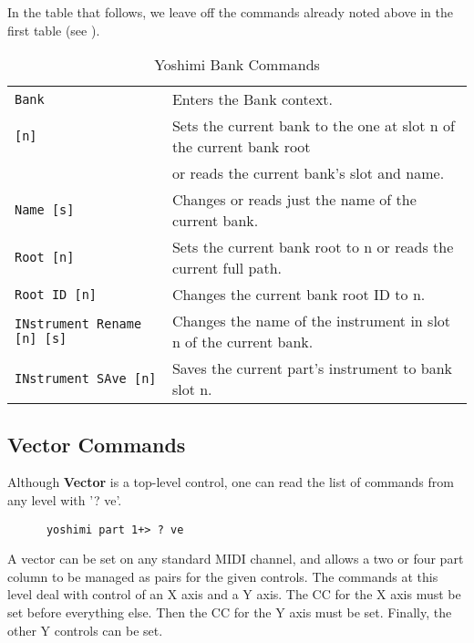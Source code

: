    In the table that follows, we leave off the commands already noted
   above in the first table
   (see ).

   \begin{table}[H]
      \centering
      \caption{Yoshimi Bank Commands}
      \label{table:yoshimi_text_bank_commands}
      \begin{tabular}{l l}

   \texttt{Bank} &
   Enters the Bank context. \\
   \texttt{[n]} &
   Sets the current bank to the one at slot n of the current bank root \\
   \texttt{  } &
   or reads the current bank's slot and name. \\
  \texttt{Name [s]} &
  Changes or reads just the name of the current bank. \\
  \texttt{Root [n]} &
  Sets the current bank root to n or reads the current full path. \\
  \texttt{Root ID [n]} &
  Changes the current bank root ID to n.  \\
  \texttt{INstrument Rename [n] [s]} &
  Changes the name of the instrument in slot n of the current bank.  \\
  \texttt{INstrument SAve [n]} &
  Saves the current part's instrument to bank slot n.  \\

        \end{tabular}
   \end{table}

\subsection{Vector Commands}
\label{subsec:command_line_vector_command_list}

   Although \textbf{Vector} is a top-level control, one can read the list of
   commands from any level with '? ve'.

   \begin{verbatim}
      yoshimi part 1+> ? ve
   \end{verbatim}
   A vector can be set on any standard MIDI channel, and allows a two or four
   part column to be managed as pairs for the given controls.
   The commands at this level deal with control of an X axis and a Y axis.
   The CC for the X axis must be set before everything else.  Then the CC for
   the Y axis must be set.  Finally, the other Y controls can be set.

